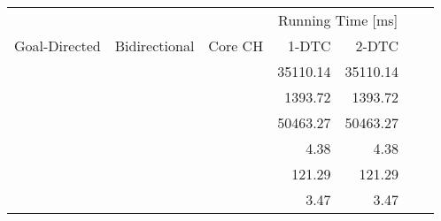 \begin{tabular}{cccrrrr}
	\toprule
	              &               &         & \multicolumn{2}{c}{Running Time [\si{\milli\second}]}            \\
	Goal-Directed & Bidirectional & Core CH & 1-DTC                                                 & 2-DTC    \\
	\midrule
	\xmark        & \xmark        & \xmark  & 35110.14                                              & 35110.14 \\
	\cmark        & \xmark        & \xmark  & 1393.72                                               & 1393.72  \\
	\xmark        & \cmark        & \xmark  & 50463.27                                              & 50463.27 \\
	\cmark        & \cmark        & \xmark  & 4.38                                                  & 4.38     \\
	\xmark        & \cmark        & \cmark  & 121.29                                                & 121.29   \\
	\cmark        & \cmark        & \cmark  & 3.47                                                  & 3.47     \\
	\bottomrule
\end{tabular}